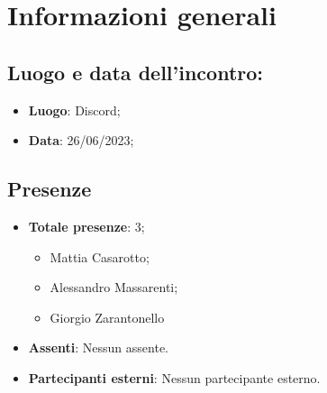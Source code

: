\section{Informazioni generali}
    \subsection{Luogo e data dell'incontro:}
    \begin{itemize}
        \item \textbf{Luogo}: Discord;
        \item \textbf{Data}: 26/06/2023;
    \end{itemize}
    \subsection{Presenze}
    \begin{itemize}
        \item \textbf{Totale presenze}: 3;
        \begin{itemize}
            \item Mattia Casarotto;
            \item Alessandro Massarenti;
            \item Giorgio Zarantonello
        \end{itemize}
        \item \textbf{Assenti}: Nessun assente.
        \item \textbf{Partecipanti esterni}: Nessun partecipante esterno.
    \end{itemize}